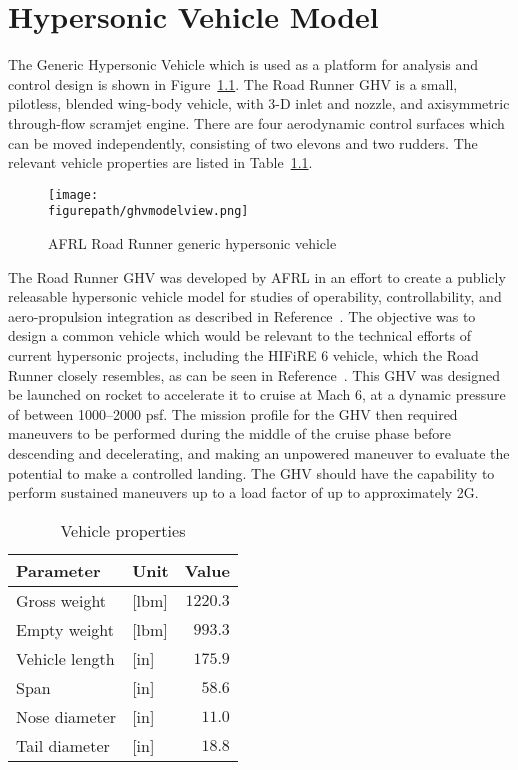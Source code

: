 \chapter{Hypersonic Vehicle Model}

The Generic Hypersonic Vehicle which is used as a platform for analysis and control design is shown in Figure~\ref{fig.ghvclouds}.
The Road Runner GHV is a small, pilotless, blended wing-body vehicle, with 3-D inlet and nozzle, and axisymmetric through-flow scramjet engine.
There are four aerodynamic control surfaces which can be moved independently, consisting of two elevons and two rudders.
The relevant vehicle properties are listed in Table~\ref{tab:vehicle_properties}.

\begin{figure}[h]
  \begin{center}
    \texttt{[image: \\figurepath/ghvmodelview.png]}
    \caption{AFRL Road Runner generic hypersonic vehicle\ \cite{ruttle.ghv.2012}\label{fig.ghvclouds}}
  \end{center}
\end{figure}

The Road Runner GHV was developed by AFRL in an effort to create a publicly releasable hypersonic vehicle model for studies of operability, controllability, and aero-propulsion integration as described in Reference\ \cite{ruttle.ghv.2012}.
The objective was to design a common vehicle which would be relevant to the technical efforts of current hypersonic projects, including the HIFiRE 6 vehicle, which the Road Runner closely resembles, as can be seen in Reference\ \cite{bolender.hifire6.2012}.
This GHV was designed be launched on rocket to accelerate it to cruise at Mach 6, at a dynamic pressure of between 1000--2000 psf.
The mission profile for the GHV then required maneuvers to be performed during the middle of the cruise phase before descending and decelerating, and making an unpowered maneuver to evaluate the potential to make a controlled landing.
The GHV should have the capability to perform sustained maneuvers up to a load factor of up to approximately 2G.

\begin{table}[H]
  \centering
  \caption{Vehicle properties}
  \begin{tabular}{llr}
    \toprule
    Parameter & Unit & Value \\
    \midrule
    Gross weight & [lbm] & $1220.3$ \\
    Empty weight & [lbm] & $993.3$ \\
    Vehicle length & [in] & $175.9$ \\
    Span & [in] & $58.6$ \\
    Nose diameter & [in] & $11.0$ \\
    Tail diameter & [in] & $18.8$ \\
    \bottomrule
  \end{tabular}\label{tab:vehicle_properties}
\end{table}

